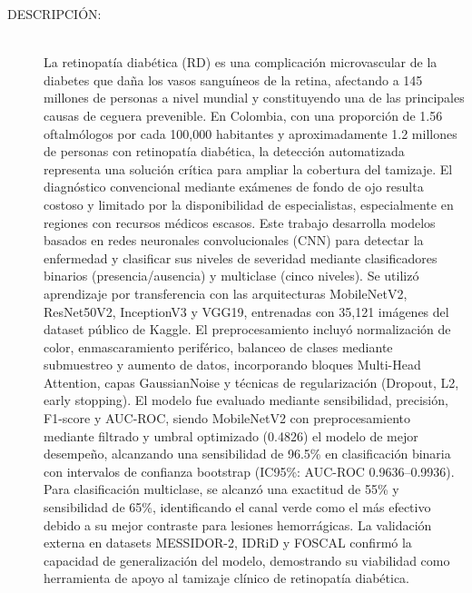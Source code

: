 {\begin{description}
  \item[DESCRIPCIÓN:] \hfill \\La retinopatía diabética (RD) es una complicación microvascular de la diabetes que daña los vasos sanguíneos de la retina, afectando a 145 millones de personas a nivel mundial y constituyendo una de las principales causas de ceguera prevenible. En Colombia, con una proporción de 1.56 oftalmólogos por cada 100,000 habitantes y aproximadamente 1.2 millones de personas con retinopatía diabética, la detección automatizada representa una solución crítica para ampliar la cobertura del tamizaje. El diagnóstico convencional mediante exámenes de fondo de ojo resulta costoso y limitado por la disponibilidad de especialistas, especialmente en regiones con recursos médicos escasos. Este trabajo desarrolla modelos basados en redes neuronales convolucionales (CNN) para detectar la enfermedad y clasificar sus niveles de severidad mediante clasificadores binarios (presencia/ausencia) y multiclase (cinco niveles). Se utilizó aprendizaje por transferencia con las arquitecturas MobileNetV2, ResNet50V2, InceptionV3 y VGG19, entrenadas con 35,121 imágenes del dataset público de Kaggle. El preprocesamiento incluyó normalización de color, enmascaramiento periférico, balanceo de clases mediante submuestreo y aumento de datos, incorporando bloques Multi-Head Attention, capas GaussianNoise y técnicas de regularización (Dropout, L2, early stopping). El modelo fue evaluado mediante sensibilidad, precisión, F1-score y AUC-ROC, siendo MobileNetV2 con preprocesamiento mediante filtrado y umbral optimizado (0.4826) el modelo de mejor desempeño, alcanzando una sensibilidad de 96.5\% en clasificación binaria con intervalos de confianza bootstrap (IC95\%: AUC-ROC 0.9636–0.9936). Para clasificación multiclase, se alcanzó una exactitud de 55\% y sensibilidad de 65\%, identificando el canal verde como el más efectivo debido a su mejor contraste para lesiones hemorrágicas. La validación externa en datasets MESSIDOR-2, IDRiD y FOSCAL confirmó la capacidad de generalización del modelo, demostrando su viabilidad como herramienta de apoyo al tamizaje clínico de retinopatía diabética.
\end{description}}\normalsize
